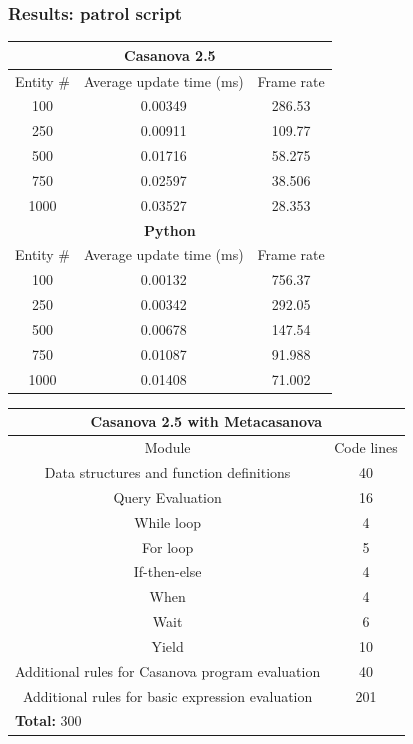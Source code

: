 \documentclass[10pt,a4paper]{beamer}
\begin{document}
\begin{frame}
	\frametitle{Results: patrol script}
	\begin{table}
		\centering
		\tiny	
		\begin{tabular}{|c|c|c|}
			\hline
			\multicolumn{3}{|c|}{\textbf{Casanova 2.5}} \\
			\hline
			Entity \# & Average update time (ms) & Frame rate \\
			\hline
			100 & 0.00349 & 286.53 \\
			\hline
			250 & 0.00911 & 109.77 \\
			\hline
			500 & 0.01716 & 58.275 \\
			\hline
			750 & 0.02597 & 38.506 \\
			\hline
			1000 & 0.03527 & 28.353 \\
			\hline
			\multicolumn{3}{|c|}{\textbf{Python}} \\
			\hline
			Entity \# & Average update time (ms) & Frame rate \\
			\hline
			100 & 0.00132 & 756.37 \\
			\hline
			250 & 0.00342 & 292.05 \\
			\hline
			500 & 0.00678 & 147.54 \\
			\hline
			750 & 0.01087 & 91.988 \\
			\hline
			1000 & 0.01408 & 71.002 \\
			\hline
		\end{tabular}
		\quad
		\begin{tabular}{|c|c|}
			\hline
			\multicolumn{2}{|c|}{\textbf{Casanova 2.5 with Metacasanova}} \\
			\hline
			Module & Code lines \\
			\hline
			Data structures and function definitions & 40 \\
			\hline
			Query Evaluation & 16 \\
			\hline
			While loop & 4 \\
			\hline
			For loop & 5 \\
			\hline
			If-then-else & 4 \\
			\hline
			When & 4 \\
			\hline
			Wait & 6 \\
			\hline
			Yield & 10 \\
			\hline
			Additional rules for Casanova program evaluation & 40 \\
			\hline
			Additional rules for basic expression evaluation & 201 \\
			\hline
			\multicolumn{2}{|l|}{\textbf{Total: } 300} \\

\end{tabular}
\end{table}
\end{frame}
\end{document}
